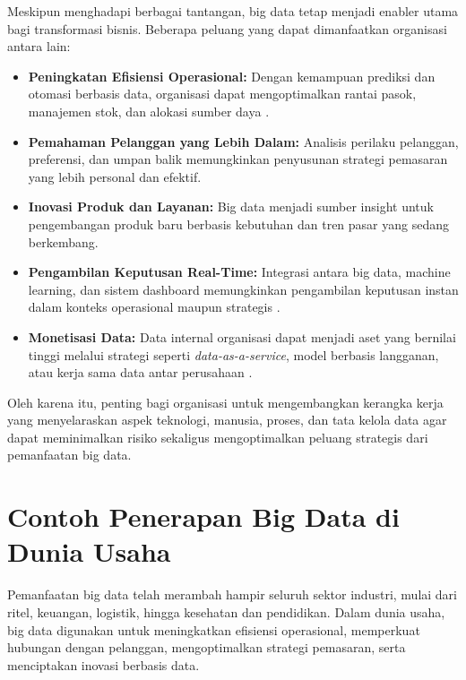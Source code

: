 Meskipun menghadapi berbagai tantangan, big data tetap menjadi enabler utama bagi transformasi bisnis. Beberapa peluang yang dapat dimanfaatkan organisasi antara lain:

\begin{itemize}
	\item \textbf{Peningkatan Efisiensi Operasional:} Dengan kemampuan prediksi dan otomasi berbasis data, organisasi dapat mengoptimalkan rantai pasok, manajemen stok, dan alokasi sumber daya \cite{george2014}.
	
	\item \textbf{Pemahaman Pelanggan yang Lebih Dalam:} Analisis perilaku pelanggan, preferensi, dan umpan balik memungkinkan penyusunan strategi pemasaran yang lebih personal dan efektif.
	
	\item \textbf{Inovasi Produk dan Layanan:} Big data menjadi sumber insight untuk pengembangan produk baru berbasis kebutuhan dan tren pasar yang sedang berkembang.
	
	\item \textbf{Pengambilan Keputusan Real-Time:} Integrasi antara big data, machine learning, dan sistem dashboard memungkinkan pengambilan keputusan instan dalam konteks operasional maupun strategis \cite{russom2011}.
	
	\item \textbf{Monetisasi Data:} Data internal organisasi dapat menjadi aset yang bernilai tinggi melalui strategi seperti \textit{data-as-a-service}, model berbasis langganan, atau kerja sama data antar perusahaan \cite{labreuche2020}.
\end{itemize}

Oleh karena itu, penting bagi organisasi untuk mengembangkan kerangka kerja yang menyelaraskan aspek teknologi, manusia, proses, dan tata kelola data agar dapat meminimalkan risiko sekaligus mengoptimalkan peluang strategis dari pemanfaatan big data.


\section{Contoh Penerapan Big Data di Dunia Usaha}

Pemanfaatan big data telah merambah hampir seluruh sektor industri, mulai dari ritel, keuangan, logistik, hingga kesehatan dan pendidikan. Dalam dunia usaha, big data digunakan untuk meningkatkan efisiensi operasional, memperkuat hubungan dengan pelanggan, mengoptimalkan strategi pemasaran, serta menciptakan inovasi berbasis data.

